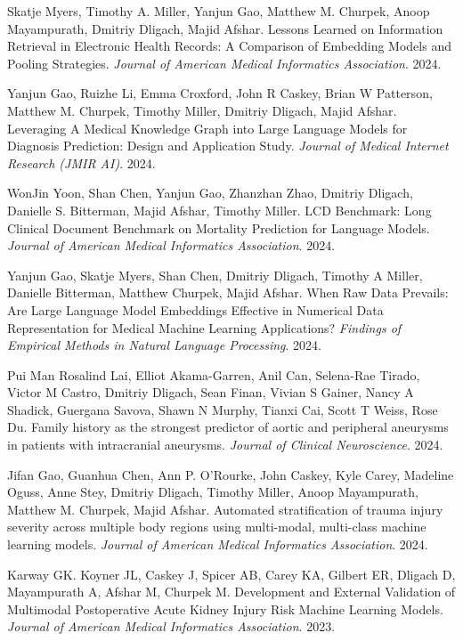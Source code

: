 \documentclass[letterpaper]{article}
\renewenvironment{itemize}{
  \begin{list}{}{
    \setlength{\leftmargin}{1.5em}
  }
}{
  \end{list}
}
\begin{document}
\begin{itemize}
\item Skatje Myers, Timothy A. Miller, Yanjun Gao, Matthew M. Churpek, Anoop Mayampurath, Dmitriy Dligach, Majid Afshar. Lessons Learned on Information Retrieval in Electronic Health Records: A Comparison of Embedding Models and Pooling Strategies. \emph{Journal of American Medical Informatics Association}. 2024.
\item Yanjun Gao, Ruizhe Li, Emma Croxford, John R Caskey, Brian W Patterson, Matthew M. Churpek, Timothy Miller, Dmitriy Dligach, Majid Afshar. Leveraging A Medical Knowledge Graph into Large Language Models for Diagnosis Prediction: Design and Application Study. \emph{Journal of Medical Internet Research (JMIR AI)}. 2024.
\item WonJin Yoon, Shan Chen, Yanjun Gao, Zhanzhan Zhao, Dmitriy Dligach, Danielle S. Bitterman, Majid Afshar, Timothy Miller. LCD Benchmark: Long Clinical Document Benchmark on Mortality Prediction for Language Models. \emph{Journal of American Medical Informatics Association}. 2024.
\item Yanjun Gao, Skatje Myers, Shan Chen, Dmitriy Dligach, Timothy A Miller, Danielle Bitterman, Matthew Churpek, Majid Afshar. When Raw Data Prevails: Are Large Language Model Embeddings Effective in Numerical Data Representation for Medical Machine Learning Applications? \emph{Findings of Empirical Methods in Natural Language Processing}. 2024.
\item Pui Man Rosalind Lai, Elliot Akama-Garren, Anil Can, Selena-Rae Tirado, Victor M Castro, Dmitriy Dligach, Sean Finan, Vivian S Gainer, Nancy A Shadick, Guergana Savova, Shawn N Murphy, Tianxi Cai, Scott T Weiss, Rose Du. Family history as the strongest predictor of aortic and peripheral aneurysms in patients with intracranial aneurysms. \emph{Journal of Clinical Neuroscience}. 2024.
\item Jifan Gao, Guanhua Chen, Ann P. O’Rourke, John Caskey, Kyle Carey, Madeline Oguss, Anne Stey, Dmitriy Dligach, Timothy Miller, Anoop Mayampurath, Matthew M. Churpek, Majid Afshar. Automated stratification of trauma injury severity across multiple body regions using multi-modal, multi-class machine learning models. \emph{Journal of American Medical Informatics Association}. 2024.
\item Karway GK. Koyner JL, Caskey J, Spicer AB, Carey KA, Gilbert ER, Dligach D, Mayampurath A, Afshar M, Churpek M. Development and External Validation of Multimodal Postoperative Acute Kidney Injury Risk Machine Learning Models. \emph{Journal of American Medical Informatics Association}. 2023.

\end{itemize}
\end{document}
